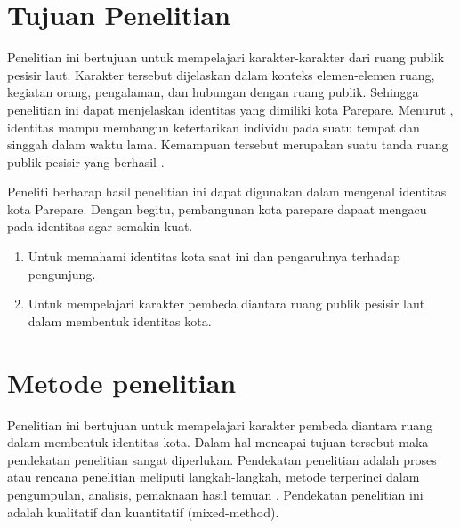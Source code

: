 \documentclass[12pt]{simart} %
\begin{document}
\section{Tujuan Penelitian}
Penelitian ini bertujuan untuk mempelajari karakter-karakter dari ruang publik pesisir laut. Karakter tersebut dijelaskan dalam konteks elemen-elemen ruang, kegiatan orang, pengalaman, dan hubungan dengan ruang publik. Sehingga penelitian ini dapat menjelaskan identitas yang dimiliki kota Parepare. Menurut \cite{oktay2002}, identitas mampu membangun ketertarikan individu pada suatu tempat dan singgah dalam waktu lama. Kemampuan tersebut merupakan suatu tanda ruang publik pesisir yang berhasil \citep{hussein2014}.

Peneliti berharap hasil penelitian ini dapat digunakan dalam mengenal identitas kota Parepare.
Dengan begitu, pembangunan kota parepare dapaat mengacu pada identitas agar semakin kuat.

\begin{enumerate}
    \item Untuk memahami identitas kota saat ini dan pengaruhnya terhadap pengunjung.
    \item Untuk mempelajari karakter pembeda diantara ruang publik pesisir laut dalam membentuk identitas kota.
\end{enumerate}

\section{Metode penelitian}

Penelitian ini bertujuan untuk mempelajari karakter pembeda diantara ruang dalam membentuk identitas kota. Dalam hal mencapai tujuan tersebut maka pendekatan penelitian sangat diperlukan. Pendekatan penelitian adalah proses atau rencana penelitian meliputi langkah-langkah, metode terperinci dalam pengumpulan, analisis, pemaknaan hasil temuan \citep{creswell2016}. Pendekatan penelitian ini adalah kualitatif dan kuantitatif (mixed-method).
\end{document}
